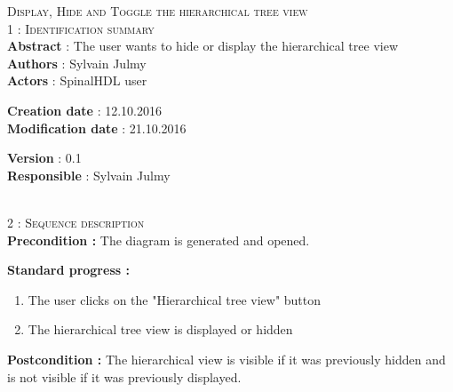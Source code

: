 \begin{flushleft}
    \textsc{\huge Display, Hide and Toggle the hierarchical tree view}\\[0.5cm]

    \BlackLine
    \textsc{\Large 1 : Identification summary}\\[0.3cm]

        \textbf{\large Abstract} : The user wants to hide or display the hierarchical tree view \\[0.1cm]

        \textbf{\large Authors} : Sylvain Julmy \\[0.3cm]			

        \textbf{\large Actors} : SpinalHDL user \\[0.1cm]	
    \begin{minipage}{0.40\textwidth}
        \begin{flushleft}	
            \textbf{\large Creation date} : 12.10.2016 \\[0.1cm]

            \textbf{\large Modification date} : 21.10.2016 \\[0.1cm]
        \end{flushleft}
    \end{minipage}
    \begin{minipage}{0.40\textwidth}
        \begin{flushleft}
            \textbf{\large Version} : 0.1 \\[0.1cm]

            \textbf{\large Responsible} : Sylvain Julmy \\[0.1cm]
        \end{flushleft}
    \end{minipage}
    \\[0.5cm]
    \BlackLine
    \textsc{\Large 2 : Sequence description}\\[0.3cm]

    \textbf{\large Precondition :} The diagram is generated and opened.

    \textbf{\large  Standard progress :}
    \begin{enumerate}[nosep]
        \item The user clicks on the "Hierarchical tree view" button
        \item The hierarchical tree view is displayed or hidden
    \end{enumerate}

    \textbf{\large Postcondition :} The hierarchical view is visible if it was
    previously hidden and is not visible if it was previously displayed.


\end{flushleft}
